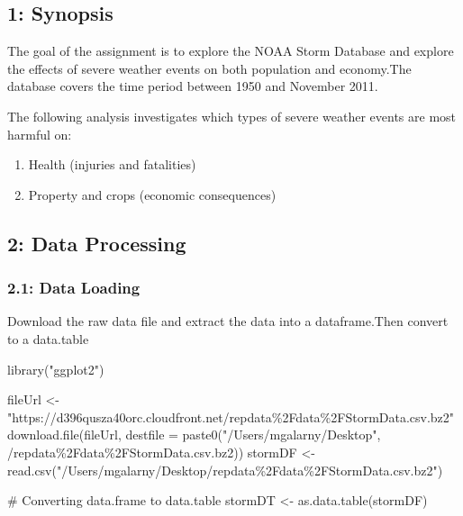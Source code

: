 \documentclass[
]{article}
\author{}
\date{\vspace{-2.5em}}
\newenvironment{Shaded}{\begin{snugshade}}{\end{snugshade}}
\newcommand{\NormalTok}[1]{#1}
\providecommand{\tightlist}{%
  \setlength{\itemsep}{0pt}\setlength{\parskip}{0pt}}
\begin{document}
\hypertarget{synopsis}{%
\subsection{1: Synopsis}\label{synopsis}}

The goal of the assignment is to explore the NOAA Storm Database and
explore the effects of severe weather events on both population and
economy.The database covers the time period between 1950 and November
2011.

The following analysis investigates which types of severe weather events
are most harmful on:

\begin{enumerate}
\def\labelenumi{\arabic{enumi}.}
\tightlist
\item
  Health (injuries and fatalities)
\item
  Property and crops (economic consequences)
\end{enumerate}

\hypertarget{data-processing}{%
\subsection{2: Data Processing}\label{data-processing}}

\hypertarget{data-loading}{%
\subsubsection{2.1: Data Loading}\label{data-loading}}

Download the raw data file and extract the data into a dataframe.Then
convert to a data.table

\begin{Shaded}
\begin{Highlighting}[]
\NormalTok{library("ggplot2")}

\NormalTok{fileUrl \textless{}{-} "https://d396qusza40orc.cloudfront.net/repdata\%2Fdata\%2FStormData.csv.bz2"}
\NormalTok{download.file(fileUrl, destfile = paste0("/Users/mgalarny/Desktop", \textquotesingle{}/repdata\%2Fdata\%2FStormData.csv.bz2\textquotesingle{}))}
\NormalTok{stormDF \textless{}{-} read.csv("/Users/mgalarny/Desktop/repdata\%2Fdata\%2FStormData.csv.bz2")}

\NormalTok{\# Converting data.frame to data.table}
\NormalTok{stormDT \textless{}{-} as.data.table(stormDF)}
\end{Highlighting}
\end{Shaded}
\end{document}
